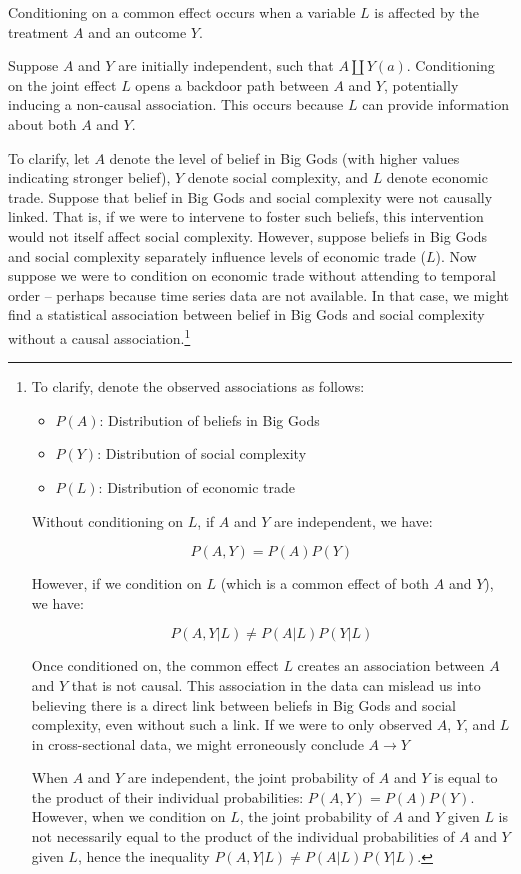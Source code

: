 \documentclass[
  singlecolumn]{article}
\providecommand{\tightlist}{%
  \setlength{\itemsep}{0pt}\setlength{\parskip}{0pt}}\usepackage{longtable,booktabs,array}
\begin{document}
Conditioning on a common effect occurs when a variable \(L\) is affected
by the treatment \(A\) and an outcome \(Y\).

Suppose \(A\) and \(Y\) are initially independent, such that
\(A \coprod Y(a)\). Conditioning on the joint effect \(L\) opens a
backdoor path between \(A\) and \(Y\), potentially inducing a non-causal
association. This occurs because \(L\) can provide information about
both \(A\) and \(Y\).

To clarify, let \(A\) denote the level of belief in Big Gods (with
higher values indicating stronger belief), \(Y\) denote social
complexity, and \(L\) denote economic trade. Suppose that belief in Big
Gods and social complexity were not causally linked. That is, if we were
to intervene to foster such beliefs, this intervention would not itself
affect social complexity. However, suppose beliefs in Big Gods and
social complexity separately influence levels of economic trade (\(L\)).
Now suppose we were to condition on economic trade without attending to
temporal order -- perhaps because time series data are not available. In
that case, we might find a statistical association between belief in Big
Gods and social complexity without a causal association.\footnote{To
  clarify, denote the observed associations as follows:

  \begin{itemize}
  \tightlist
  \item
    \(P(A)\): Distribution of beliefs in Big Gods
  \item
    \(P(Y)\): Distribution of social complexity
  \item
    \(P(L)\): Distribution of economic trade
  \end{itemize}

  Without conditioning on \(L\), if \(A\) and \(Y\) are independent, we
  have:

  \[P(A, Y) = P(A)P(Y)\]

  However, if we condition on \(L\) (which is a common effect of both
  \(A\) and \(Y\)), we have:

  \[P(A, Y | L) \neq P(A | L)P(Y | L)\]

  Once conditioned on, the common effect \(L\) creates an association
  between \(A\) and \(Y\) that is not causal. This association in the
  data can mislead us into believing there is a direct link between
  beliefs in Big Gods and social complexity, even without such a link.
  If we were to only observed \(A\), \(Y\), and \(L\) in cross-sectional
  data, we might erroneously conclude \(A \to Y\)

  When \(A\) and \(Y\) are independent, the joint probability of \(A\)
  and \(Y\) is equal to the product of their individual probabilities:
  \(P(A, Y) = P(A)P(Y)\). However, when we condition on \(L\), the joint
  probability of \(A\) and \(Y\) given \(L\) is not necessarily equal to
  the product of the individual probabilities of \(A\) and \(Y\) given
  \(L\), hence the inequality \(P(A, Y | L) \neq P(A | L)P(Y | L)\).}
\end{document}
